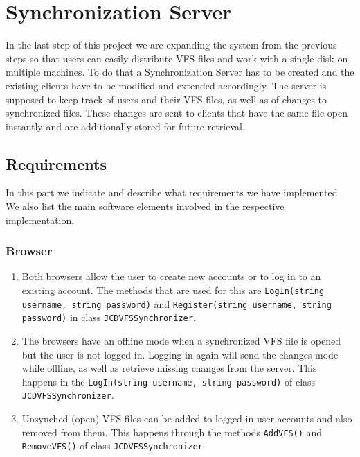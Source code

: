 \documentclass[a4paper,12pt]{article}
\begin{document}

\section{Synchronization Server}
In the last step of this project we are expanding the system from the previous steps so that users can easily distribute VFS files and work with a single disk on multiple machines. To do that a Synchronization Server has to be created and the existing clients have to be modified and extended accordingly.\newline
The server is supposed to keep track of users and their VFS files, as well as of changes to synchronized files. These changes are sent to clients that have the same file open instantly and are additionally stored for future retrieval.


\subsection{Requirements}
In this part we indicate and describe what requirements we have implemented. We also list the main software elements involved in the respective implementation.

\subsubsection{Browser}
\begin{enumerate}
	\item Both browsers allow the user to create new accounts or to log in to an existing account. The methods that are used for this are \texttt{LogIn(string username, string password)} and \texttt{Register(string username, string password)} in class \texttt{JCDVFSSynchronizer}.
	\item The browsers have an offline mode when a synchronized VFS file is opened but the user is not logged in. Logging in again will send the changes mode while offline, as well as retrieve missing changes from the server.	This happens in the \texttt{LogIn(string username, string password)} of class \texttt{JCDVFSSynchronizer}.
	\item Unsynched (open) VFS files can be added to logged in user accounts and also removed from them. This happens through the methods \texttt{AddVFS()} and \texttt{RemoveVFS()} of class \texttt{JCDVFSSynchronizer}.
	\end{enumerate}
\end{document}
